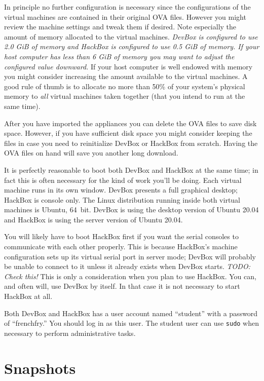 \documentclass[twocolumn]{article}
\begin{document}
In principle no further configuration is necessary since the configurations of the virtual
machines are contained in their original OVA files. However you might review the machine
settings and tweak them if desired. Note especially the amount of memory allocated to the
virtual machines. \emph{DevBox is configured to use 2.0 GiB of memory and HackBox is configured
  to use 0.5 GiB of memory. If your host computer has less than 6 GiB of memory you may want to
  adjust the configured value downward.} If your host computer is well endowed with memory you
might consider increasing the amount available to the virtual machines. A good rule of thumb is
to allocate no more than 50\% of your system's physical memory to \emph{all} virtual machines
taken together (that you intend to run at the same time).

After you have imported the appliances you can delete the OVA files to save disk space. However,
if you have sufficient disk space you might consider keeping the files in case you need to
reinitialize DevBox or HackBox from scratch. Having the OVA files on hand will save you another
long download.

It is perfectly reasonable to boot both DevBox and HackBox at the same time; in fact this is
often necessary for the kind of work you'll be doing. Each virtual machine runs in its own
window. DevBox presents a full graphical desktop; HackBox is console only. The Linux
distribution running inside both virtual machines is Ubuntu, 64~bit. DevBox is using the desktop
version of Ubuntu 20.04 and HackBox is using the server version of Ubuntu 20.04.

You will likely have to boot HackBox first if you want the serial consoles to communicate with
each other properly. This is because HackBox's machine configuration sets up its virtual serial
port in server mode; DevBox will probably be unable to connect to it unless it already exists
when DevBox starts. \textit{TODO: Check this!} This is only a consideration when you plan to use
HackBox. You can, and often will, use DevBox by itself. In that case it is not necessary to
start HackBox at all.

Both DevBox and HackBox has a user account named ``student'' with a password of ``frenchfry.''
You should log in as this user. The student user can use \texttt{sudo} when necessary to perform
administrative tasks.

\section{Snapshots}
\end{document}
